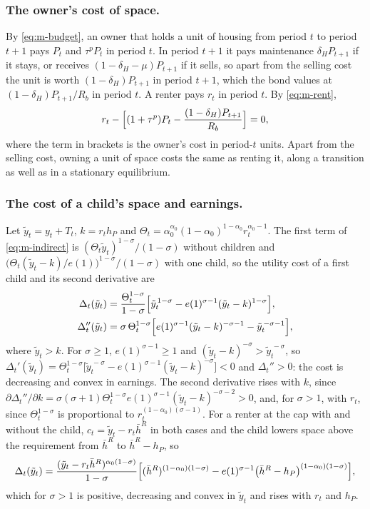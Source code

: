 \subsubsection*{The owner's cost of space.}
By \eqref{eq:m-budget}, an owner that holds a unit of housing from period $t$
to period $t+1$ pays $P_t$ and $\tau^pP_t$ in period $t$. In period $t+1$ it
pays maintenance $\delta_HP_{t+1}$ if it stays, or receives
$(1-\delta_H-\mu)P_{t+1}$ if it sells, so apart from the selling cost the unit
is worth $(1-\delta_H)P_{t+1}$ in period $t+1$, which the bond values at
$(1-\delta_H)P_{t+1}/R_b$ in period $t$. A renter pays $r_t$ in period $t$. By
\eqref{eq:m-rent},
\begin{equation}
 r_t-\Bigl[(1+\tau^p)P_t-\frac{(1-\delta_H)P_{t+1}}{R_b}\Bigr]=0,
 \label{eq:app-usercost}
\end{equation}
where the term in brackets is the owner's cost in period-$t$ units. Apart from
the selling cost, owning a unit of space costs the same as renting it, along a
transition as well as in a stationary equilibrium.

\subsubsection*{The cost of a child's space and earnings.}
Let $\tilde y_t=y_t+T_t$, $k=r_th_P$ and
$\Theta_t=\alpha_0^{\alpha_0}(1-\alpha_0)^{1-\alpha_0}r_t^{\alpha_0-1}$. The
first term of \eqref{eq:m-indirect} is $(\Theta_t\tilde y_t)^{1-\sigma}/(1-\sigma)$
without children and
$\bigl(\Theta_t(\tilde y_t-k)/e(1)\bigr)^{1-\sigma}/(1-\sigma)$ with one
child, so the utility cost of a first child and its second derivative are
\begin{equation}
\begin{aligned}
 \Delta_t(\tilde y_t)&=\frac{\Theta_t^{1-\sigma}}{1-\sigma}\Bigl[\tilde y_t^{\,1-\sigma}-e(1)^{\sigma-1}(\tilde y_t-k)^{1-\sigma}\Bigr],\\
 \Delta_t''(\tilde y_t)&=\sigma\,\Theta_t^{1-\sigma}\Bigl[e(1)^{\sigma-1}(\tilde y_t-k)^{-\sigma-1}-\tilde y_t^{\,-\sigma-1}\Bigr],
\end{aligned}
\label{eq:app-delta}
\end{equation}
where $\tilde y_t>k$. For $\sigma\ge1$, $e(1)^{\sigma-1}\ge1$ and
$(\tilde y_t-k)^{-\sigma}>\tilde y_t^{\,-\sigma}$, so
$\Delta_t'(\tilde y_t)=\Theta_t^{1-\sigma}\bigl[\tilde y_t^{\,-\sigma}-e(1)^{\sigma-1}(\tilde y_t-k)^{-\sigma}\bigr]<0$
and $\Delta_t''>0$: the cost is decreasing and convex in earnings. The
second derivative rises with $k$, since
$\partial\Delta_t''/\partial k=\sigma(\sigma+1)\Theta_t^{1-\sigma}e(1)^{\sigma-1}(\tilde y_t-k)^{-\sigma-2}>0$,
and, for $\sigma>1$, with $r_t$, since $\Theta_t^{1-\sigma}$ is proportional
to $r_t^{(1-\alpha_0)(\sigma-1)}$. For a renter at the cap with and without
the child, $c_t=\tilde y_t-r_t\bar h^R$ in both cases and the child lowers
space above the requirement from $\bar h^R$ to $\bar h^R-h_P$, so
\[
 \Delta_t(\tilde y_t)=\frac{(\tilde y_t-r_t\bar h^R)^{\alpha_0(1-\sigma)}}{1-\sigma}
 \Bigl[(\bar h^R)^{(1-\alpha_0)(1-\sigma)}-e(1)^{\sigma-1}\bigl(\bar h^R-h_P\bigr)^{(1-\alpha_0)(1-\sigma)}\Bigr],
\]
which for $\sigma>1$ is positive, decreasing and convex in $\tilde y_t$ and
rises with $r_t$ and $h_P$.
